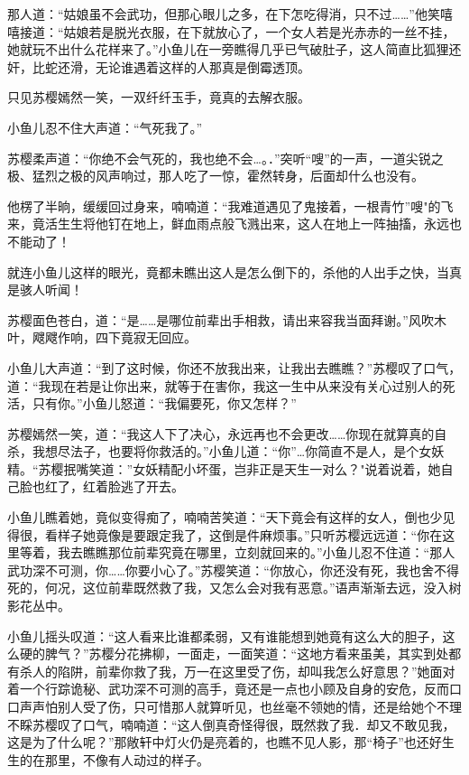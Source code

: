 \documentclass[12pt,oneside]{book}
\begin{document}
那人道：``姑娘虽不会武功，但那心眼儿之多，在下怎吃得消，只不过\ldots\ldots{}''他笑嘻嘻接道：``姑娘若是脱光衣服，在下就放心了，一个女人若是光赤赤的一丝不挂，她就玩不出什么花样来了。''小鱼儿在一旁瞧得几乎已气破肚子，这人简直比狐狸还奸，比蛇还滑，无论谁遇着这样的人那真是倒霉透顶。

只见苏樱嫣然一笑，一双纤纤玉手，竟真的去解衣服。

小鱼儿忍不住大声道：``气死我了。''

苏樱柔声道：``你绝不会气死的，我也绝不会\ldots。．''突听``嗖''的一声，一道尖锐之极、猛烈之极的风声响过，那人吃了一惊，霍然转身，后面却什么也没有。

他楞了半晌，缓缓回过身来，喃喃道：``我难道遇见了鬼接着，一根青竹''嗖"的飞来，竟活生生将他钉在地上，鲜血雨点般飞溅出来，这人在地上一阵抽搐，永远也不能动了！

就连小鱼儿这样的眼光，竟都未瞧出这人是怎么倒下的，杀他的人出手之快，当真是骇人听闻！

苏樱面色苍白，道：``是\ldots\ldots 是哪位前辈出手相救，请出来容我当面拜谢。''风吹木叶，飕飕作响，四下竟寂无回应。

小鱼儿大声道：``到了这时候，你还不放我出来，让我出去瞧瞧？''苏樱叹了口气，道：``我现在若是让你出来，就等于在害你，我这一生中从来没有关心过别人的死活，只有你。''小鱼儿怒道：``我偏要死，你又怎样？''

苏樱嫣然一笑，道：``我这人下了决心，永远再也不会更改\ldots\ldots 你现在就算真的自杀，我想尽法子，也要将你救活的。''小鱼儿道：``你''\ldots 你简直不是人，是个女妖精。``苏樱抿嘴笑道：''女妖精配小坏蛋，岂非正是天生一对么？"说着说着，她自己脸也红了，红着脸逃了开去。

小鱼儿瞧着她，竟似变得痴了，喃喃苦笑道：``天下竟会有这样的女人，倒也少见得很，看样子她竟像是要跟定我了，这倒是件麻烦事。''只听苏樱远远道：``你在这里等着，我去瞧瞧那位前辈究竟在哪里，立刻就回来的。''小鱼儿忍不住道：``那人武功深不可测，你\ldots\ldots 你要小心了。''苏樱笑道：``你放心，你还没有死，我也舍不得死的，何况，这位前辈既然救了我，又怎么会对我有恶意。''语声渐渐去远，没入树影花丛中。

小鱼儿摇头叹道：``这人看来比谁都柔弱，又有谁能想到她竟有这么大的胆子，这么硬的脾气？''苏樱分花拂柳，一面走，一面笑道：``这地方看来虽美，其实到处都有杀人的陷阱，前辈你救了我，万一在这里受了伤，却叫我怎么好意思？''她面对着一个行踪诡秘、武功深不可测的高手，竟还是一点也小顾及自身的安危，反而口口声声怕别人受了伤，只可惜那人就算听见，也丝毫不领她的情，还是给她个不理不睬苏樱叹了口气，喃喃道：``这人倒真奇怪得很，既然救了我．却又不敢见我，这是为了什么呢？''那敞轩中灯火仍是亮着的，也瞧不见人影，那``椅子''也还好生生的在那里，不像有人动过的样子。
\end{document}
